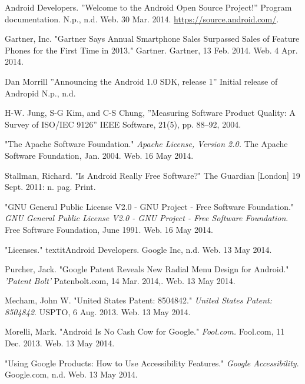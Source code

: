 \documentclass[conference]{IEEEtran}
\begin{document}
\begin{thebibliography}{1}


Android Developers. ''Welcome to the Android Open Source Project!'' Program documentation. N.p., n.d. Web. 30 Mar. 2014. \url{https://source.android.com/}.

Gartner, Inc. "Gartner Says Annual Smartphone Sales Surpassed Sales of Feature Phones for the First Time in 2013." Gartner. Gartner, 13 Feb. 2014. Web. 4 Apr. 2014.

Dan Morrill ''Announcing the Android 1.0 SDK, release 1'' Initial release of Andropid N.p., n.d. 

H-W. Jung, S-G Kim, and C-S Chung, ''Measuring Software Product Quality: A Survey of ISO/IEC 9126'' IEEE Software, 21(5), pp. 88--92, 2004.

"The Apache Software Foundation." \textit{Apache License, Version 2.0.} The Apache Software Foundation, Jan. 2004. Web. 16 May 2014.

Stallman, Richard. "Is Android Really Free Software?" The Guardian [London] 19 Sept. 2011: n. pag. Print.

"GNU General Public License V2.0 - GNU Project - Free Software Foundation." \textit{GNU General Public License V2.0 - GNU Project - Free Software Foundation}. Free Software Foundation, June 1991. Web. 16 May 2014.

"Licenses." textit{Android Developers}. Google Inc, n.d. Web. 13 May 2014.

Purcher, Jack. "Google Patent Reveals New Radial Menu Design for Android." \textit{'Patent Bolt'} Patenbolt.com, 14 Mar. 2014,. Web. 13 May 2014.

Mecham, John W. "United States Patent: 8504842." \textit{United States Patent: 8504842}. USPTO, 6 Aug. 2013. Web. 13 May 2014.

Morelli, Mark. "Android Is No Cash Cow for Google." \textit{Fool.com.} Fool.com, 11 Dec. 2013. Web. 13 May 2014.

"Using Google Products: How to Use Accessibility Features." \textit{Google Accessibility}. Google.com, n.d. Web. 13 May 2014.


\end{thebibliography}
\end{document}
